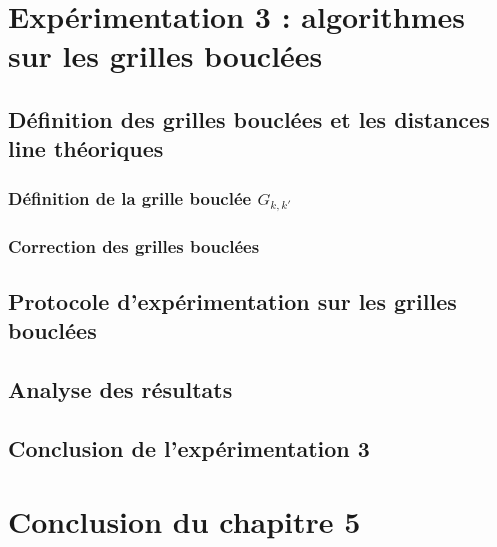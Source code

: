\section{Exp\'erimentation 3 : algorithmes sur les grilles boucl\'ees}
	
	\subsection{D\'efinition des grilles boucl\'ees et les distances line th\'eoriques}
%		
		\subsubsection{D\'efinition de la grille boucl\'ee $G_{k,k'}$ }
			
		\subsubsection{Correction des grilles boucl\'ees}
			
	\subsection{Protocole d'exp\'erimentation sur les grilles boucl\'ees}
		
	\subsection{Analyse des r\'esultats}
		
	\subsection{Conclusion de l'exp\'erimentation 3}
		

	\section{Conclusion du chapitre 5}
		

%	

